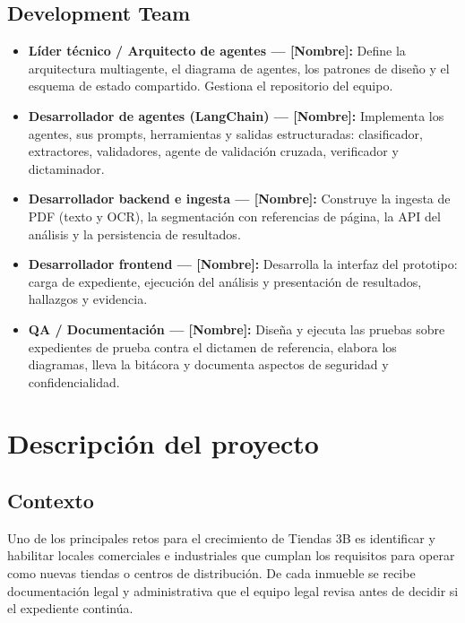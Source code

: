 \documentclass[11pt, a4paper]{article}
\begin{document}
\subsection*{Development Team}

\begin{itemize}
    \item \textbf{Líder técnico / Arquitecto de agentes — [Nombre]:} Define la arquitectura multiagente, el diagrama de agentes, los patrones de diseño y el esquema de estado compartido. Gestiona el repositorio del equipo.
    \item \textbf{Desarrollador de agentes (LangChain) — [Nombre]:} Implementa los agentes, sus prompts, herramientas y salidas estructuradas: clasificador, extractores, validadores, agente de validación cruzada, verificador y dictaminador.
    \item \textbf{Desarrollador backend e ingesta — [Nombre]:} Construye la ingesta de PDF (texto y OCR), la segmentación con referencias de página, la API del análisis y la persistencia de resultados.
    \item \textbf{Desarrollador frontend — [Nombre]:} Desarrolla la interfaz del prototipo: carga de expediente, ejecución del análisis y presentación de resultados, hallazgos y evidencia.
    \item \textbf{QA / Documentación — [Nombre]:} Diseña y ejecuta las pruebas sobre expedientes de prueba contra el dictamen de referencia, elabora los diagramas, lleva la bitácora y documenta aspectos de seguridad y confidencialidad.
\end{itemize}

\section{Descripción del proyecto}

\subsection*{Contexto}
Uno de los principales retos para el crecimiento de Tiendas 3B es identificar y habilitar locales comerciales e industriales que cumplan los requisitos para operar como nuevas tiendas o centros de distribución. De cada inmueble se recibe documentación legal y administrativa que el equipo legal revisa antes de decidir si el expediente continúa.
\end{document}
